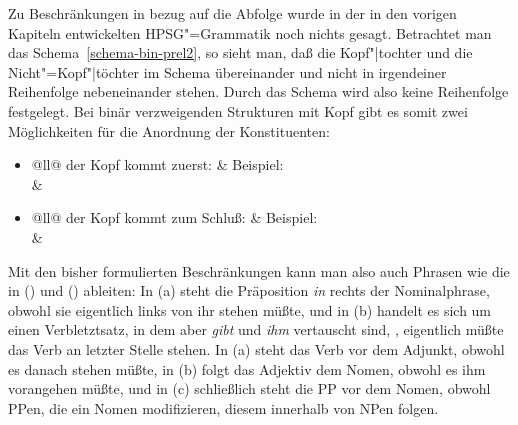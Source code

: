 Zu Beschränkungen in bezug auf die Abfolge wurde in der in den vorigen Kapiteln entwickelten
HPSG"=Grammatik noch nichts gesagt. Betrachtet man das Schema~\ref{schema-bin-prel2}, so sieht man,
daß die Kopf"|tochter und die Nicht"=Kopf"|töchter im Schema übereinander und nicht in irgendeiner
Reihenfolge nebeneinander stehen. Durch das Schema wird also keine Reihenfolge festgelegt. Bei binär
verzweigenden Strukturen mit Kopf gibt es somit zwei Möglichkeiten für die Anordnung der
Konstituenten:
\begin{itemize}
\item \begin{tabular}[t]{@{}ll@{}}
der Kopf kommt zuerst:                                   & Beispiel:\\
%
&%
\\
\end{tabular}
\item \begin{tabular}[t]{@{}ll@{}}
der Kopf kommt zum Schluß:                            & Beispiel:\\
%
&%
\\
\end{tabular}
\end{itemize}


\noindent
Mit den bisher formulierten Beschränkungen kann man also auch Phrasen wie die in () und () ableiten:
\eal
{}
\zl
\eal
{}
\zl
In (a) steht die Präposition \emph{in} rechts der Nominalphrase, obwohl sie eigentlich links von
ihr stehen müßte, und in (b) handelt es sich um einen Verbletztsatz, in dem aber \emph{gibt} und \emph{ihm}
vertauscht sind, \dash, eigentlich müßte das Verb an letzter Stelle stehen. In (a) steht das Verb vor
dem Adjunkt, obwohl es danach stehen müßte, in (b) folgt das Adjektiv dem Nomen,
obwohl es ihm vorangehen müßte, und in (c) schließlich steht die PP vor dem Nomen, obwohl
PPen, die ein Nomen modifizieren, diesem innerhalb von NPen folgen.

